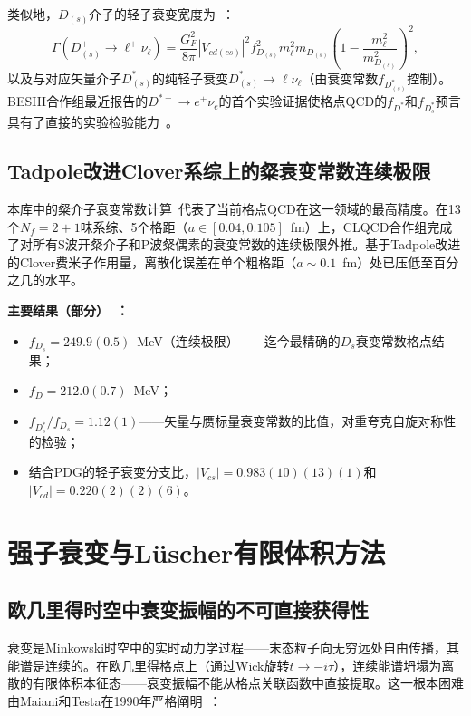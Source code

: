 \documentclass[12pt,a4paper]{ctexart}
\theoremstyle{definition}
\begin{document}
类似地，$D_{(s)}$介子的轻子衰变宽度为~\cite{CharmedClover}：
\begin{equation}
\Gamma(D_{(s)}^+ \to \ell^+\nu_\ell) = \frac{G_F^2}{8\pi} |V_{cd(cs)}|^2 f_{D_{(s)}}^2 m_\ell^2 m_{D_{(s)}} \left(1 - \frac{m_\ell^2}{m_{D_{(s)}}^2}\right)^2,
\label{eq:D_width}
\end{equation}
以及与对应矢量介子$D_{(s)}^*$的纯轻子衰变$D_{(s)}^* \to \ell\nu_\ell$（由衰变常数$f_{D_{(s)}^*}$控制）。BESIII合作组最近报告的$D^{*+}\to e^+\nu_e$的首个实验证据使格点QCD的$f_{D^*}$和$f_{D_s^*}$预言具有了直接的实验检验能力~\cite{CharmedClover}。

\subsection{Tadpole改进Clover系综上的粲衰变常数连续极限}

本库中的粲介子衰变常数计算~\cite{CharmedClover}代表了当前格点QCD在这一领域的最高精度。在13个$N_f=2+1$味系综、5个格距（$a\in[0.04,0.105]$~fm）上，CLQCD合作组完成了对所有S波开粲介子和P波粲偶素的衰变常数的连续极限外推。基于Tadpole改进的Clover费米子作用量，离散化误差在单个粗格距（$a\sim 0.1$~fm）处已压低至百分之几的水平。

\textbf{主要结果（部分）~\cite{CharmedClover}：}
\begin{itemize}[nosep]
    \item $f_{D_s} = 249.9(0.5)$~MeV（连续极限）——迄今最精确的$D_s$衰变常数格点结果；
    \item $f_D = 212.0(0.7)$~MeV；
    \item $f_{D_s^*}/f_{D_s} = 1.12(1)$——矢量与赝标量衰变常数的比值，对重夸克自旋对称性的检验；
    \item 结合PDG的轻子衰变分支比，$|V_{cs}| = 0.983(10)(13)(1)$和$|V_{cd}| = 0.220(2)(2)(6)$。
\end{itemize}

\section{强子衰变与L\"uscher有限体积方法}

\subsection{欧几里得时空中衰变振幅的不可直接获得性}

衰变是Minkowski时空中的实时动力学过程——末态粒子向无穷远处自由传播，其能谱是连续的。在欧几里得格点上（通过Wick旋转$t\to -i\tau$），连续能谱坍塌为离散的有限体积本征态——衰变振幅不能从格点关联函数中直接提取。这一根本困难由Maiani和Testa在1990年严格阐明~\cite{GattringerLang2010}：
\end{document}
